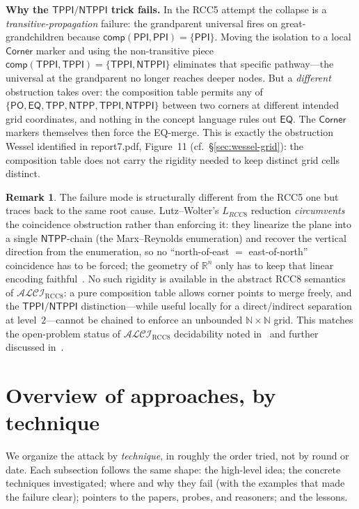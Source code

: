 \documentclass[11pt]{article}
\newcommand{\ALCIRCC}[1]{\mathcal{ALCI}_{\mathrm{RCC#1}}}
\newcommand{\PO}{\mathsf{PO}}
\newcommand{\PPI}{\mathsf{PPI}}
\newcommand{\EQ}{\mathsf{EQ}}
\newcommand{\TPP}{\ensuremath{\mathsf{TPP}}}
\newcommand{\NTPP}{\ensuremath{\mathsf{NTPP}}}
\newcommand{\TPPI}{\ensuremath{\mathsf{TPPI}}}
\newcommand{\NTPPI}{\ensuremath{\mathsf{NTPPI}}}
\newcommand{\naturals}{\mathbb{N}}
\newcommand{\reals}{\mathbb{R}}
\newcommand{\LRCC}[1]{\ensuremath{L_{\mathit{RCC#1}}}}
\newcommand{\comp}{\ensuremath{\mathsf{comp}}}
\theoremstyle{plain}
\theoremstyle{definition}
\newtheorem{remark}[theorem]{Remark}
\begin{document}
\medskip\noindent\textbf{Why the $\TPPI/\NTPPI$ trick fails.} In
the RCC5 attempt the collapse is a \emph{transitive-propagation}
failure: the grandparent universal fires on great-grandchildren
because $\comp(\PPI,\PPI) = \{\PPI\}$.  Moving the isolation to a
local $\textsf{Corner}$ marker and using the non-transitive piece
$\comp(\TPPI,\TPPI) = \{\TPPI, \NTPPI\}$ eliminates that specific
pathway---the universal at the grandparent no longer reaches
deeper nodes.  But a \emph{different} obstruction takes over: the
composition table permits any of
$\{\PO, \EQ, \TPP, \NTPP, \TPPI, \NTPPI\}$ between two corners at
different intended grid coordinates, and nothing in the concept
language rules out $\EQ$.  The $\textsf{Corner}$ markers themselves
then force the EQ-merge.  This is exactly the obstruction Wessel
identified in report7.pdf, Figure~11 (cf.~\S\ref{sec:wessel-grid}):
the composition table does not carry the rigidity needed to keep
distinct grid cells distinct.

\begin{remark}
The failure mode is structurally different from the RCC5 one but
traces back to the same root cause.  Lutz--Wolter's $\LRCC{8}$
reduction \emph{circumvents} the coincidence obstruction rather than
enforcing it: they linearize the plane into a single $\NTPP$-chain
(the Marx--Reynolds enumeration) and recover the vertical direction
from the enumeration, so no ``north-of-east $=$ east-of-north''
coincidence has to be forced; the geometry of $\reals^n$ only has to
keep that linear encoding faithful~\cite{LutzWolter2006}.  No such rigidity is available in
the abstract RCC8 semantics of $\ALCIRCC{8}$: a pure composition
table allows corner points to merge freely, and the $\TPPI/\NTPPI$
distinction---while useful locally for a direct/indirect
separation at level~2---cannot be chained to enforce an unbounded
$\naturals \times \naturals$ grid.  This matches the open-problem
status of $\ALCIRCC{8}$ decidability noted in~\cite{LutzWolter2006}
and further discussed in~\cite{Wessel2003}.
\end{remark}


\section{Overview of approaches, by technique}
\label{sec:approaches}

We organize the attack by \emph{technique}, in roughly the order tried,
not by round or date. Each subsection follows the same shape: the
high-level idea; the concrete techniques investigated; where and why they
fail (with the examples that made the failure clear); pointers to the
papers, probes, and reasoners; and the lessons.
\end{document}
